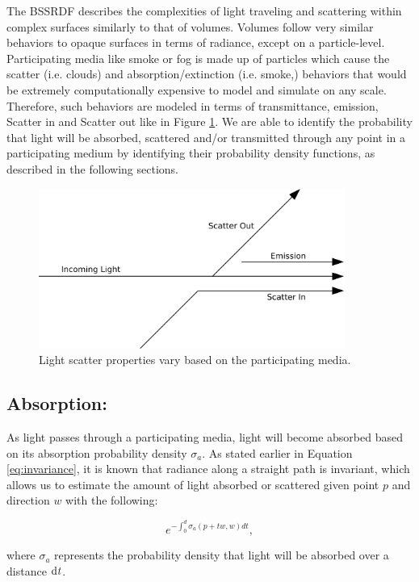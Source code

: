 The BSSRDF describes the complexities of light traveling and scattering within complex surfaces similarly to that of volumes.  Volumes follow very similar behaviors to opaque surfaces in terms of radiance, except on a particle-level.  Participating media like smoke or fog is made up of particles which cause the scatter (i.e. clouds) and absorption/extinction (i.e. smoke,) behaviors that would be extremely computationally expensive to model and simulate on any scale.  Therefore, such behaviors are modeled in terms of transmittance, emission, Scatter in and Scatter out like in Figure \ref{fig:vol_scat}.  We are able to identify the probability that light will be absorbed, scattered and/or transmitted through any point in a participating medium by identifying their probability density functions, as described in the following sections. 
\begin{figure}[h!]
    \centering
    \includegraphics[width=100mm]{../img/vol_scatter.pdf}
    \captionfonts
    \caption{Light scatter properties vary based on the participating media.}
    \label{fig:vol_scat}
\end{figure}

\subsection{Absorption:}
As light passes through a participating media, light will become absorbed based on its absorption probability density $\sigma_{a}$. As stated earlier in Equation \ref{eq:invariance}, it is known that radiance along a straight path is invariant, which allows us to estimate the amount of light absorbed or scattered given point $p$ and direction $w$ with the following:

\begin{equation}
e^{-\int_{0}^{d}\sigma_{a} (p+t\mathit{w},\mathit{w})d\mathit{t}},
\label{siga_eq}
\end{equation}

where $\sigma_{a}$ represents the probability density that light will be absorbed over a distance $\textup{d}\mathit{t}$.

